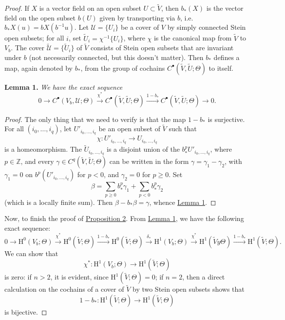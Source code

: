 \documentclass[british]{article}
\newenvironment{itenv}[1]
  {\phantomsection\par\smallskip\noindent\textbf{#1.}\itshape}
  {\par\smallskip}
\newcommand{\oldpage}[1]{\marginpar{\footnotesize$\Big\vert$ \textit{p.~#1}}}
\begin{document}
\begin{proof}
If \(X\) is a vector field on an open subset \(U\subset\widetilde{V}\),
then \(b_*(X)\) is the vector field on the open subset \(b(U)\) given by
transporting via \(b\), i.e.~\(b_*X(u)=bX(b^{-1}u)\). Let
\(\mathscr{U}=\{U_i\}\) be a cover of \(V\) by simply connected Stein
open subsets; for all \(i\), set \(\widetilde{U}_i=\chi^{-1}\{U_i\}\),
where \(\chi\) is the canonical map from \(\widetilde{V}\) to \(V_b\).
The cover \(\widetilde{\mathscr{U}}=\{\widetilde{U}_i\}\) of
\(\widetilde{V}\) consists of Stein open subsets that are invariant
under \(b\) (not necessarily connected, but this doesn't matter). Then
\(b_*\) defines a map, again denoted by \(b_*\), from the group of
cochains \(C^\bullet(\widetilde{V},\widetilde{U};\Theta)\) to itself.

\protect{}\label{three-lemma-1}
\begin{itenv}{Lemma 1}
We have the exact sequence \[
  0
  \to C^\bullet(V_b,\mathscr{U};\Theta)
  \xrightarrow{\chi^*} C^\bullet(\widetilde{V},\widetilde{U};\Theta)
  \xrightarrow{1-b_*} C^\bullet(\widetilde{V},\widetilde{U};\Theta)
  \to 0.
\]

\end{itenv}

\begin{proof}
The only thing that we need to verify is that the map \(1-b_*\) is
surjective. For all \((i_0,\ldots,i_q)\), let \(U'_{i_0,\ldots,i_q}\) be
an open subset of \(\widetilde{V}\) such that \oldpage{3-05} \[
  \chi\colon U'_{i_0,\ldots,i_q} \to U_{i_0,\ldots,i_q}
\] is a homeomorphism. The \(\widetilde{U}_{i_0,\ldots,i_q}\) is a
disjoint union of the \(b_*^p U'_{i_0,\ldots,i_q}\), where
\(p\in\mathbb{Z}\), and every
\(\gamma\in C^q(\widetilde{V},\widetilde{U};\Theta)\) can be written in
the form \(\gamma=\gamma_1-\gamma_2\), with \(\gamma_1=0\) on
\(b^p(U'_{i_0,\ldots,i_q})\) for \(p<0\), and \(\gamma_2=0\) for
\(p\geqslant 0\). Set \[
  \beta = \sum_{p\geqslant 0} b_*^p\gamma_1 + \sum_{p<0} b_*^p\gamma_2
\] (which is a locally finite sum). Then \(\beta-b_*\beta=\gamma\),
whence \hyperref[three-lemma-1]{Lemma 1}.
\end{proof}

Now, to finish the proof of \hyperref[three-proposition-2]{Proposition
2}. From \hyperref[three-lemma-1]{Lemma 1}, we have the following exact
sequence: \[
  0
  \to \mathrm{H}^0(V_b;\Theta)
  \xrightarrow{\chi^*} \mathrm{H}^0(\widetilde{V};\Theta)
  \xrightarrow{1-b_*} \mathrm{H}^0(\widetilde{V};\Theta)
  \xrightarrow{\delta_*} \mathrm{H}^1(V_b;\Theta)
  \xrightarrow{\chi^*} \mathrm{H}^1(\widetilde{V}y\Theta)
  \xrightarrow{1-b_*} \mathrm{H}^1(\widetilde{V};\Theta).
\] We can show that \[
  \chi^*\colon \mathrm{H}^1(V_b;\Theta) \to \mathrm{H}^1(\widetilde{V};\Theta)
\] is zero: if \(n>2\), it is evident, since
\(\mathrm{H}^1(\widetilde{V};\Theta)=0\); if \(n=2\), then a direct
calculation on the cochains of a cover of \(\widetilde{V}\) by two Stein
open subsets shows that \[
  1-b_*\colon \mathrm{H}^1(\widetilde{V};\Theta) \to \mathrm{H}^1(\widetilde{V};\Theta)
\] is bijective.


\end{proof}
\end{document}
